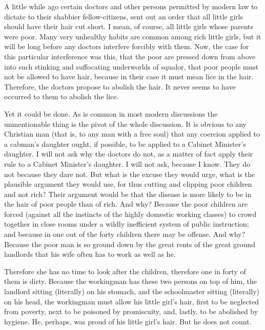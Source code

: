 \documentclass[final,10pt,letterpaper,twocolumn,openany]{book}
\begin{document}
A little while ago certain doctors and other persons permitted by
modern law to dictate to their shabbier fellow-citizens, sent out an order
that all little girls should have their hair cut short. I mean, of course, all
little girls whose parents were poor. Many very unhealthy habits are
common among rich little girls, but it will be long before any doctors
interfere forcibly with them. Now, the case for this particular interference
was this, that the poor are pressed down from above into such stinking and
suffocating underworlds of squalor, that poor people must not be allowed
to have hair, because in their case it must mean lice in the hair. Therefore,
the doctors propose to abolish the hair. It never seems to have occurred to
them to abolish the lice. 

Yet it could be done. As is common in most
modern discussions the unmentionable thing is the pivot of the whole
discussion. It is obvious to any Christian man (that is, to any man with a
free soul) that any coercion applied to a cabman's daughter ought, if
possible, to be applied to a Cabinet Minister's daughter. I will not ask why
the doctors do not, as a matter of fact apply their rule to a Cabinet
Minister's daughter. I will not ask, because I know. They do not because
they dare not. But what is the excuse they would urge, what is the
plausible argument they would use, for thus cutting and clipping poor
children and not rich? Their argument would be that the disease is more
likely to be in the hair of poor people than of rich. And why? Because the
poor children are forced (against all the instincts of the highly domestic
working classes) to crowd together in close rooms under a wildly
inefficient system of public instruction; and because in one out of the forty
children there may be offense. And why? Because the poor man is so
ground down by the great rents of the great ground landlords that his wife
often has to work as well as he. 

Therefore she has no time to look after the
children, therefore one in forty of them is dirty. Because the workingman
has these two persons on top of him, the landlord sitting (literally) on his
stomach, and the schoolmaster sitting (literally) on his head, the
workingman must allow his little girl's hair, first to be neglected from
poverty, next to be poisoned by promiscuity, and, lastly, to be abolished by
hygiene. He, perhaps, was proud of his little girl's hair. But he does not
count.
\end{document}
